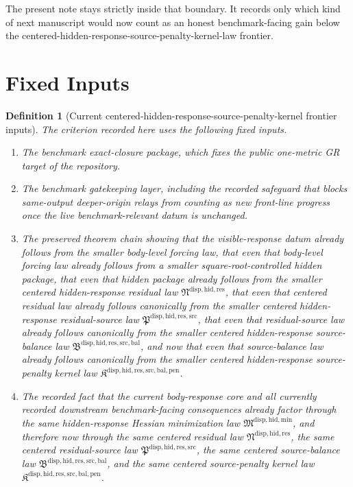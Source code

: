 \documentclass[11pt]{article}
\newcommand{\SourcePenaltyKernelLawPackage}{\mathfrak K^{\mathrm{disp,hid,res,src,bal,pen}}}
\newcommand{\SourceBalanceLawPackage}{\mathfrak B^{\mathrm{disp,hid,res,src,bal}}}
\newcommand{\ResidualSourceLawPackage}{\mathfrak P^{\mathrm{disp,hid,res,src}}}
\newcommand{\ResidualLawPackage}{\mathfrak N^{\mathrm{disp,hid,res}}}
\newcommand{\HiddenMinimizationPackage}{\mathfrak M^{\mathrm{disp,hid,min}}}
\newtheorem{definition}{Definition}
\begin{document}
The present note stays strictly inside that boundary. It records only which kind of next manuscript would now count as an honest benchmark-facing gain below the centered-hidden-response-source-penalty-kernel-law frontier.

\section{Fixed Inputs}

\begin{definition}[Current centered-hidden-response-source-penalty-kernel frontier inputs]
The criterion recorded here uses the following fixed inputs.
\begin{enumerate}
    \item The benchmark exact-closure package, which fixes the public one-metric GR target of the repository.
    \item The benchmark gatekeeping layer, including the recorded safeguard that blocks same-output deeper-origin relays from counting as new front-line progress once the live benchmark-relevant datum is unchanged.
    \item The preserved theorem chain showing that the visible-response datum already follows from the smaller body-level forcing law, that even that body-level forcing law already follows from a smaller square-root-controlled hidden package, that even that hidden package already follows from the smaller centered hidden-response residual law \(\ResidualLawPackage\), that even that centered residual law already follows canonically from the smaller centered hidden-response residual-source law \(\ResidualSourceLawPackage\), that even that residual-source law already follows canonically from the smaller centered hidden-response source-balance law \(\SourceBalanceLawPackage\), and now that even that source-balance law already follows canonically from the smaller centered hidden-response source-penalty kernel law \(\SourcePenaltyKernelLawPackage\).
    \item The recorded fact that the current body-response core and all currently recorded downstream benchmark-facing consequences already factor through the same hidden-response Hessian minimization law \(\HiddenMinimizationPackage\), and therefore now through the same centered residual law \(\ResidualLawPackage\), the same centered residual-source law \(\ResidualSourceLawPackage\), the same centered source-balance law \(\SourceBalanceLawPackage\), and the same centered source-penalty kernel law \(\SourcePenaltyKernelLawPackage\).
\end{enumerate}
\end{definition}
\end{document}
